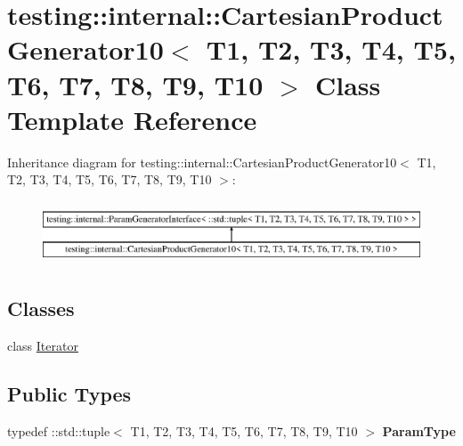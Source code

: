 \hypertarget{classtesting_1_1internal_1_1_cartesian_product_generator10}{}\section{testing\+:\+:internal\+:\+:Cartesian\+Product\+Generator10$<$ T1, T2, T3, T4, T5, T6, T7, T8, T9, T10 $>$ Class Template Reference}
\label{classtesting_1_1internal_1_1_cartesian_product_generator10}
Inheritance diagram for testing\+:\+:internal\+:\+:Cartesian\+Product\+Generator10$<$ T1, T2, T3, T4, T5, T6, T7, T8, T9, T10 $>$\+:\begin{figure}[H]
\begin{center}
\leavevmode
\includegraphics[height=1.917808cm]{classtesting_1_1internal_1_1_cartesian_product_generator10}
\end{center}
\end{figure}
\subsection*{Classes}
\begin{DoxyCompactItemize}
\item 
class \mbox{\hyperlink{classtesting_1_1internal_1_1_cartesian_product_generator10_1_1_iterator}{Iterator}}
\end{DoxyCompactItemize}
\subsection*{Public Types}
\begin{DoxyCompactItemize}
\item 
\mbox{\label{classtesting_1_1internal_1_1_cartesian_product_generator10_ac9f50e9b6fff8dad968c5b98989752f9}} 
typedef \+::std\+::tuple$<$ T1, T2, T3, T4, T5, T6, T7, T8, T9, T10 $>$ {\bfseries Param\+Type}
\end{DoxyCompactItemize}
